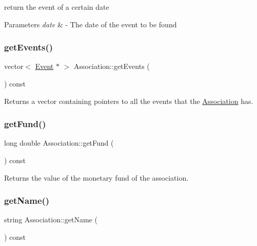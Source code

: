 return the event of a certain date 


\begin{DoxyParams}{Parameters}
{\em date} & -\/ The date of the event to be found \\
\hline
\end{DoxyParams}
\mbox{\label{classAssociation_a3deb177639e3c8042f7400f336fdda08}} 
\subsubsection{\texorpdfstring{get\+Events()}{getEvents()}}
{\footnotesize\ttfamily vector$<$ \hyperlink{classEvent}{Event} $\ast$ $>$ Association\+::get\+Events (\begin{DoxyParamCaption}{ }\end{DoxyParamCaption}) const}



Returns a vector containing pointers to all the events that the \hyperlink{classAssociation}{Association} has. 

\mbox{\label{classAssociation_a4834d8fe0057ca4c55fa3e83bc47aae5}} 
\subsubsection{\texorpdfstring{get\+Fund()}{getFund()}}
{\footnotesize\ttfamily long double Association\+::get\+Fund (\begin{DoxyParamCaption}{ }\end{DoxyParamCaption}) const}



Returns the value of the monetary fund of the association. 

\mbox{\label{classAssociation_ab9b849706f996d80ed3439d43d06a958}} 
\subsubsection{\texorpdfstring{get\+Name()}{getName()}}
{\footnotesize\ttfamily string Association\+::get\+Name (\begin{DoxyParamCaption}{ }\end{DoxyParamCaption}) const}




